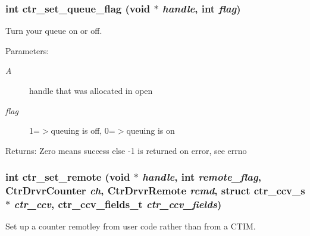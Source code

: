 \subsubsection{\setlength{\rightskip}{0pt plus 5cm}int ctr\_\-set\_\-queue\_\-flag (void $\ast$ {\em handle}, int {\em flag})}\label{libctr_8doxygen_38f3a1443afadc935ef57272ab9f849e}


Turn your queue on or off. 

\begin{Desc}
\item[Parameters:]
\begin{description}
\item[{\em A}]handle that was allocated in open \item[{\em flag}]1=$>$queuing is off, 0=$>$queuing is on \end{description}
\end{Desc}
\begin{Desc}
\item[Returns:]Zero means success else -1 is returned on error, see errno \end{Desc}
\subsubsection{\setlength{\rightskip}{0pt plus 5cm}int ctr\_\-set\_\-remote (void $\ast$ {\em handle}, int {\em remote\_\-flag}, Ctr\-Drvr\-Counter {\em ch}, Ctr\-Drvr\-Remote {\em rcmd}, struct \bf{ctr\_\-ccv\_\-s} $\ast$ {\em ctr\_\-ccv}, \bf{ctr\_\-ccv\_\-fields\_\-t} {\em ctr\_\-ccv\_\-fields})}\label{libctr_8doxygen_29d33be6c697568d4d2a13ce12855a21}


Set up a counter remotley from user code rather than from a CTIM. 

